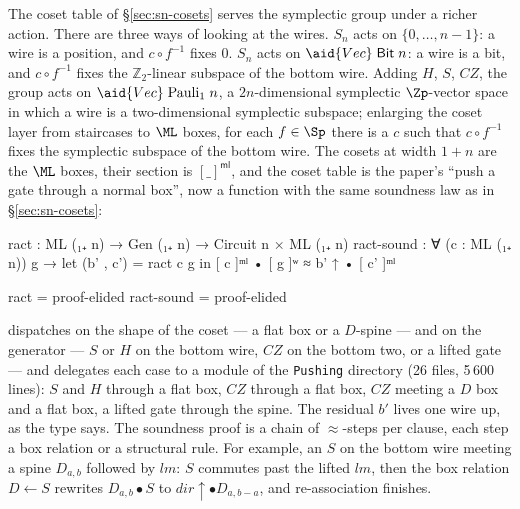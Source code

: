 The coset table of \S\ref{sec:sn-cosets} serves the symplectic group under a
richer action.  There are three ways of looking at the wires.  $S_n$
acts on $\{0,\dots,n-1\}$: a wire is a position, and $c \circ f^{-1}$
fixes $0$.  $S_n$ acts on $\aid{Vec}\;\mathsf{Bit}\;n$: a wire is a
bit, and $c \circ f^{-1}$ fixes the $\mathbb{Z}_2$-linear subspace of
the bottom wire.  Adding $H$, $S$, $CZ$, the group acts on
$\aid{Vec}\;\mathrm{Pauli}_1\;n$, a $2n$-dimensional symplectic
$\Zp$-vector space in which a wire is a two-dimensional symplectic
subspace; enlarging the coset layer from staircases to $\ML$ boxes, for
each $f \in \Sp$ there is a $c$ such that $c \circ f^{-1}$ fixes the
symplectic subspace of the bottom wire.  The cosets at width $1{+}n$
are the $\ML$ boxes, their section is $[\_]^{\mathsf{ml}}$, and the coset
table is the paper's ``push a gate through a normal box'', now a
function with the same soundness law as in \S\ref{sec:sn-cosets}:

\begingroup\renewcommand{\AgdaCodeStyle}{\footnotesize}
\begin{code}
ract        : ML (₁₊ n) → Gen (₁₊ n) → Circuit n × ML (₁₊ n)
ract-sound  : ∀ (c : ML (₁₊ n)) g → let (b' , c') = ract c g in
              [ c ]ᵐˡ • [ g ]ʷ ≈ b' ↑ • [ c' ]ᵐˡ
\end{code}
\endgroup
\begin{code}[hide]
ract = proof-elided
ract-sound = proof-elided
\end{code}

\noindent {} dispatches on the shape of the coset --- a flat box or a
$D$-spine --- and on the generator --- $S$ or $H$ on the bottom wire,
$CZ$ on the bottom two, or a lifted gate --- and delegates each case to
a module of the \texttt{Pushing} directory (26 files, 5\,600 lines):
$S$ and $H$ through a flat box, $CZ$ through a flat box, $CZ$ meeting a
$D$ box and a flat box, a lifted gate through the spine.  The residual
$b'$ lives one wire up, as the type says.  The soundness proof
 is a chain of $\approx$-steps per clause, each step a
box relation or a structural rule.  For example, an $S$ on the bottom
wire meeting a spine $D_{a,b}$ followed by $\mathit{lm}$: $S$ commutes
past the lifted $\mathit{lm}$, then the box relation
$D \leftarrow S$ rewrites $D_{a,b} \bullet S$ to $\mathit{dir}{\uparrow}
\bullet D_{a,b-a}$, and re-association finishes.

